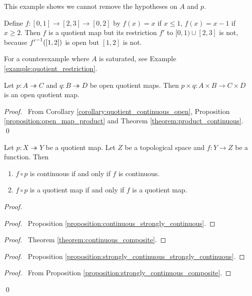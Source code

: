 \begin{example}
    This example shows we cannot remove the hypotheses on $A$ and $p$.

    Define $f : [0,1] \rightarrow [2,3] \rightarrow [0,2]$ by $f(x) = x$ if $x \leq 1$, $f(x) = x-1$ if $x \geq 2$. Then $f$ is a quotient map but its restriction $f'$ to
    $[0,1) \cup [2,3]$ is not, because ${f'}^{-1}([1,2])$ is open but $[1,2]$ is not.
\end{example}

For a counterexample where $A$ is saturated, see Example \ref{example:quotient_restriction}.

\begin{proposition}
    \label{proposition:quotient_product}
    Let $p : A \twoheadrightarrow C$ and $q : B \twoheadrightarrow D$ be open quotient maps. Then $p \times q : A \times B \rightarrow C \times D$ is an open quotient map.
\end{proposition}

\begin{proof}
    \pf\ From Corollary \ref{corollary:quotient_continuous_open}, Proposition \ref{proposition:open_map_product}
    and Theorem \ref{theorem:product_continuous}. \qed
\end{proof}

\begin{theorem}
    \label{theorem:quotient_composite}
    Let $p : X \twoheadrightarrow Y$ be a quotient map. Let $Z$
    be a topological space and $f : Y \rightarrow Z$ be a function. Then
    \begin{enumerate}
        \item $f \circ p$ is continuous if and only if $f$ is continuous.
        \item $f \circ p$ is a quotient map if and only if $f$ is a quotient map.
    \end{enumerate}
\end{theorem}

\begin{proof}
    \pf
    \begin{proof}
        \pf\ Proposition \ref{proposition:continuous_strongly_continuous}.
    \end{proof}
    \begin{proof}
        \pf\ Theorem \ref{theorem:continuous_composite}.
    \end{proof}
    \begin{proof}
        \pf\ Proposition \ref{proposition:strongly_continuous_strongly_continuous}.
    \end{proof}
    \begin{proof}
        \pf\ From Proposition \ref{proposition:strongly_continuous_composite}.
    \end{proof}
    \qed
\end{proof}

